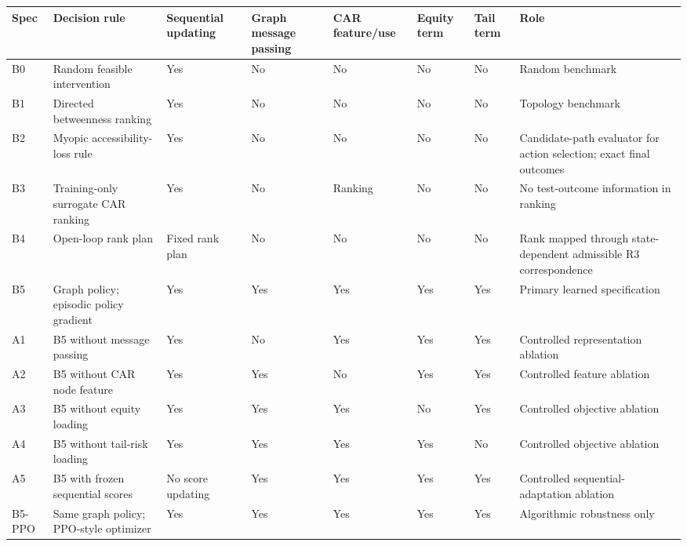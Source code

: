 \begin{tabular}{llllllll}
\toprule
Spec & Decision rule & Sequential updating & Graph message passing & CAR feature/use & Equity term & Tail term & Role \\
\midrule
B0 & Random feasible intervention & Yes & No & No & No & No & Random benchmark \\
B1 & Directed betweenness ranking & Yes & No & No & No & No & Topology benchmark \\
B2 & Myopic accessibility-loss rule & Yes & No & No & No & No & Candidate-path evaluator for action selection; exact final outcomes \\
B3 & Training-only surrogate CAR ranking & Yes & No & Ranking & No & No & No test-outcome information in ranking \\
B4 & Open-loop rank plan & Fixed rank plan & No & No & No & No & Rank mapped through state-dependent admissible R3 correspondence \\
B5 & Graph policy; episodic policy gradient & Yes & Yes & Yes & Yes & Yes & Primary learned specification \\
A1 & B5 without message passing & Yes & No & Yes & Yes & Yes & Controlled representation ablation \\
A2 & B5 without CAR node feature & Yes & Yes & No & Yes & Yes & Controlled feature ablation \\
A3 & B5 without equity loading & Yes & Yes & Yes & No & Yes & Controlled objective ablation \\
A4 & B5 without tail-risk loading & Yes & Yes & Yes & Yes & No & Controlled objective ablation \\
A5 & B5 with frozen sequential scores & No score updating & Yes & Yes & Yes & Yes & Controlled sequential-adaptation ablation \\
B5-PPO & Same graph policy; PPO-style optimizer & Yes & Yes & Yes & Yes & Yes & Algorithmic robustness only \\
\bottomrule
\end{tabular}
